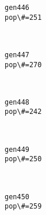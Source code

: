 \documentclass[11pt]{article}
\begin{document}
    \begin{Verbatim}[commandchars=\\\{\}]
gen446
pop\#=251

    \end{Verbatim}

    \begin{center}
    \end{center}
    { \hspace*{\fill} \\}
    
    \begin{Verbatim}[commandchars=\\\{\}]
gen447
pop\#=270

    \end{Verbatim}

    \begin{center}
    \end{center}
    { \hspace*{\fill} \\}
    
    \begin{Verbatim}[commandchars=\\\{\}]
gen448
pop\#=242

    \end{Verbatim}

    \begin{center}
    \end{center}
    { \hspace*{\fill} \\}
    
    \begin{Verbatim}[commandchars=\\\{\}]
gen449
pop\#=250

    \end{Verbatim}

    \begin{center}
    \end{center}
    { \hspace*{\fill} \\}
    
    \begin{Verbatim}[commandchars=\\\{\}]
gen450
pop\#=259

    \end{Verbatim}
\end{document}
